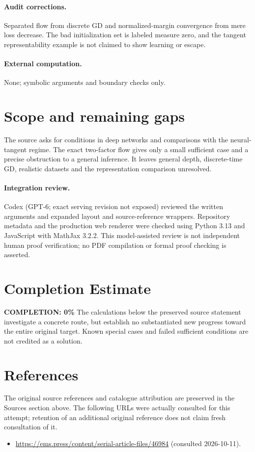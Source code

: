 \documentclass[11pt]{article}
\begin{document}
\paragraph{Audit corrections.} Separated flow from discrete GD and normalized-margin convergence from
mere loss decrease. The bad initialization set is labeled measure zero, and the
tangent representability example is not claimed to show learning or escape.
\paragraph{External computation.} None; symbolic arguments and boundary checks only.
\section{Scope and remaining gaps}

The source asks for conditions in deep networks and comparisons with the
neural-tangent regime. The exact two-factor flow gives only a small sufficient
case and a precise obstruction to a general inference. It leaves general depth,
discrete-time GD, realistic datasets and the representation comparison unresolved.

\paragraph{Integration review.} Codex (GPT-6; exact serving revision not exposed) reviewed the written arguments and expanded layout and source-reference wrappers. Repository metadata and the production web renderer were checked using Python 3.13 and JavaScript with MathJax 3.2.2. This model-assisted review is not independent human proof verification; no PDF compilation or formal proof checking is asserted.

\section{Completion Estimate}
\noindent\textbf{COMPLETION: 0\%}
The calculations below the preserved source statement investigate a concrete route,
but establish no substantiated new progress toward the entire original target.
Known special cases and failed sufficient conditions are not credited as a solution.
\section{References}
The original source references and catalogue attribution are preserved in the
Sources section above. The following URLs were actually consulted for this attempt;
retention of an additional original reference does not claim fresh consultation of it.
\begin{itemize}
\item \url{https://ems.press/content/serial-article-files/46984} (consulted 2026-10-11). 
\end{itemize}
\end{document}
